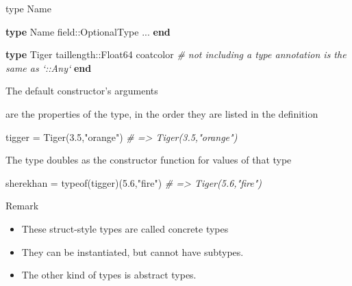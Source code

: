 \documentclass[ignorenonframetext,]{beamer}
\newenvironment{Shaded}{}{}
\newcommand{\KeywordTok}[1]{\textcolor[rgb]{0.00,0.44,0.13}{\textbf{{#1}}}}
\newcommand{\DataTypeTok}[1]{\textcolor[rgb]{0.56,0.13,0.00}{{#1}}}
\newcommand{\FloatTok}[1]{\textcolor[rgb]{0.25,0.63,0.44}{{#1}}}
\newcommand{\StringTok}[1]{\textcolor[rgb]{0.25,0.44,0.63}{{#1}}}
\newcommand{\CommentTok}[1]{\textcolor[rgb]{0.38,0.63,0.69}{\textit{{#1}}}}
\newcommand{\NormalTok}[1]{{#1}}
\providecommand{\tightlist}{%
  \setlength{\itemsep}{0pt}\setlength{\parskip}{0pt}}
\begin{document}
\begin{frame}[fragile]{type Name}

\begin{Shaded}
\begin{Highlighting}[]
\KeywordTok{type} \NormalTok{Name}
   \NormalTok{field::OptionalType}
   \NormalTok{...}
\KeywordTok{end}
\end{Highlighting}
\end{Shaded}

\begin{Shaded}
\begin{Highlighting}[]
\KeywordTok{type} \NormalTok{Tiger}
  \NormalTok{taillength::}\DataTypeTok{Float64}
  \NormalTok{coatcolor }\CommentTok{# not including a type annotation is the same as `::Any`}
\KeywordTok{end}
\end{Highlighting}
\end{Shaded}

\end{frame}

\begin{frame}[fragile]{The default constructor's arguments}

are the properties of the type, in the order they are listed in the
definition

\begin{Shaded}
\begin{Highlighting}[]
\NormalTok{tigger = Tiger(}\FloatTok{3.5}\NormalTok{,}\StringTok{"orange"}\NormalTok{) }\CommentTok{# => Tiger(3.5,"orange")}
\end{Highlighting}
\end{Shaded}

\end{frame}

\begin{frame}[fragile]{The type doubles as the constructor function for
values of that type}

\begin{Shaded}
\begin{Highlighting}[]
\NormalTok{sherekhan = typeof(tigger)(}\FloatTok{5.6}\NormalTok{,}\StringTok{"fire"}\NormalTok{) }\CommentTok{# => Tiger(5.6,"fire")}
\end{Highlighting}
\end{Shaded}

\end{frame}

\begin{frame}{Remark}

\begin{itemize}
\tightlist
\item
  These struct-style types are called concrete types
\item
  They can be instantiated, but cannot have subtypes.
\item
  The other kind of types is abstract types.
\end{itemize}

\end{frame}
\end{document}
